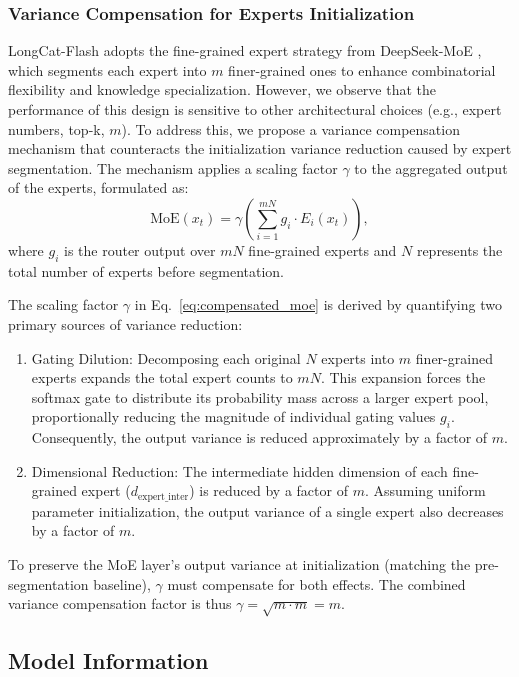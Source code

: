\documentclass{article}
\newcommand{\longcat}{LongCat-Flash\xspace}
\begin{document}
\subsubsection{Variance Compensation for Experts Initialization}
\longcat adopts the fine-grained expert strategy from DeepSeek-MoE \citep{liu2024deepseek}, which segments each expert into $m$ finer-grained ones to enhance combinatorial flexibility and knowledge specialization. However, we observe that the performance of this design is sensitive to other architectural choices (e.g., expert numbers, top-k, $m$). To address this, we propose a variance compensation mechanism that counteracts the initialization variance reduction caused by expert segmentation. The mechanism applies a scaling factor $\gamma$ to the aggregated output of the experts, formulated as:
\begin{equation}
    \text{MoE}(x_t) = \gamma \left( \sum_{i=1}^{mN} g_i \cdot E_i(x_t) \right),
    \label{eq:compensated_moe}
\end{equation}
where $g_i$ is the router output over $mN$ fine-grained experts and $N$ represents the total number of experts before segmentation.

The scaling factor $\gamma$ in Eq.~\eqref{eq:compensated_moe} is derived by quantifying two primary sources of variance reduction:
\begin{enumerate}
    \item Gating Dilution: Decomposing each original $N$ experts into $m$ finer-grained experts expands the total expert counts to $mN$. This expansion forces the softmax gate to distribute its probability mass across a larger expert pool, proportionally reducing the magnitude of individual gating values $g_i$. Consequently, the output variance is reduced approximately by a factor of $m$.
    \item Dimensional Reduction: The intermediate hidden dimension of each fine-grained expert ($d_{\text{expert\_inter}}$) is reduced by a factor of $m$. Assuming uniform parameter initialization, the output variance of a single expert also decreases by a factor of $m$.
\end{enumerate}

To preserve the MoE layer’s output variance at initialization (matching the pre-segmentation baseline), $\gamma$ must compensate for both effects. The combined variance compensation factor is thus $\gamma = \sqrt{m \cdot m}= m$.

\subsection{Model Information}
\end{document}
